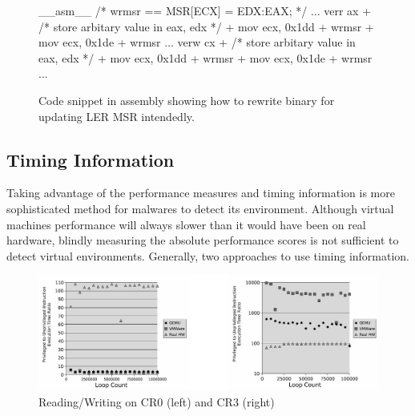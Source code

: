 \begin{figure}[h]
\begin{lstc}
__asm__ {
	/* wrmsr == MSR[ECX] = EDX:EAX; */
	...
	verr ax
+	/* store arbitary value in eax, edx */
+	mov ecx, 0x1dd
+	wrmsr 
+	mov ecx, 0x1de
+	wrmsr
	...
	verw cx
+	/* store arbitary value in eax, edx */
+	mov ecx, 0x1dd
+	wrmsr
+	mov ecx, 0x1de
+	wrmsr
	...
}

\end{lstc}
\caption{\label{fig:wrmsr} Code snippet in assembly showing how to rewrite binary for updating LER MSR intendedly. }
\end{figure}

\subsection{Timing Information}
\label{sec:approach-timing}
Taking advantage of the performance measures and timing information is more sophisticated method for malwares to detect its environment. Although virtual machine\textquotesingle s performance will always slower than it would have been on real hardware, blindly measuring the absolute performance scores is not sufficient to detect virtual environments.\cite{raffetseder2007} Generally, two approaches to use timing information.

\begin{figure}[!t]
	\centering
	\includegraphics[width=\textwidth]{figure/comp_inst.jpg}
	\caption{Reading/Writing on CR0 (left) and CR3 (right)}
	\label{fig:comparison_of_instructions}
\end{figure}


